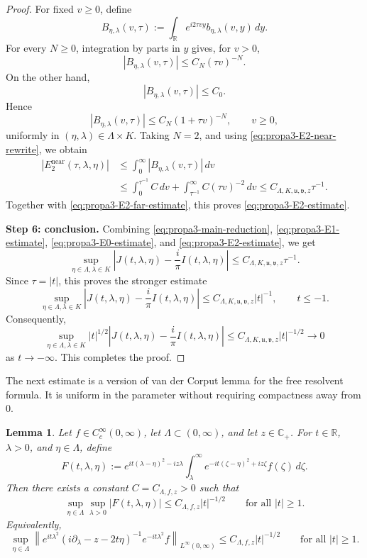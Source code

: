 \documentclass[10pt]{article}
\newtheorem{lemma}[theorem]{Lemma}
\numberwithin{equation}{section}
\numberwithin{theorem}{section}
\begin{document}
\begin{appendix}
\begin{proof}
For fixed \(v\ge0\), define
\[
B_{\eta,\lambda}(v,\tau)
:=
\int_{\mathbb R}e^{i2\tau vy}b_{\eta,\lambda}(v,y)\,dy.
\]
For every \(N\ge0\), integration by parts in \(y\) gives, for \(v>0\),
\[
|B_{\eta,\lambda}(v,\tau)|
\le
C_N(\tau v)^{-N}.
\]
On the other hand,
\[
|B_{\eta,\lambda}(v,\tau)|\le C_0.
\]
Hence
\begin{equation}
\label{eq:propa3-B-bound}
|B_{\eta,\lambda}(v,\tau)|
\le
C_N(1+\tau v)^{-N},
\qquad v\ge0,
\end{equation}
uniformly in \((\eta,\lambda)\in\Lambda\times K\). Taking \(N=2\), and using
\eqref{eq:propa3-E2-near-rewrite}, we obtain
\[
\begin{aligned}
|E_2^{\mathrm{near}}(\tau,\lambda,\eta)|
&\le
\int_0^\infty |B_{\eta,\lambda}(v,\tau)|\,dv  \\
&\le
\int_0^{\tau^{-1}} C\,dv
+
\int_{\tau^{-1}}^\infty C(\tau v)^{-2}\,dv
\le
C_{\Lambda,K,\mathfrak u,\mathfrak v,z}\tau^{-1}.
\end{aligned}
\]
Together with \eqref{eq:propa3-E2-far-estimate}, this proves
\eqref{eq:propa3-E2-estimate}.

\medskip
\noindent\textbf{Step 6: conclusion.}
Combining \eqref{eq:propa3-main-reduction}, \eqref{eq:propa3-E1-estimate},
\eqref{eq:propa3-E0-estimate}, and \eqref{eq:propa3-E2-estimate}, we get
\[
\sup_{\eta\in\Lambda,\lambda\in K}
\left|
J(t,\lambda,\eta)-\frac{i}{\pi}I(t,\lambda,\eta)
\right|
\le
C_{\Lambda,K,\mathfrak u,\mathfrak v,z}\tau^{-1}.
\]
Since \(\tau=|t|\), this proves the stronger estimate
\[
\sup_{\eta\in\Lambda,\lambda\in K}
\left|
J(t,\lambda,\eta)-\frac{i}{\pi}I(t,\lambda,\eta)
\right|
\le
C_{\Lambda,K,\mathfrak u,\mathfrak v,z}|t|^{-1},
\qquad t\le-1.
\]
Consequently,
\[
\sup_{\eta\in\Lambda,\lambda\in K}
|t|^{1/2}
\left|
J(t,\lambda,\eta)-\frac{i}{\pi}I(t,\lambda,\eta)
\right|
\le
C_{\Lambda,K,\mathfrak u,\mathfrak v,z}|t|^{-1/2}
\to0
\]
as \(t\to-\infty\). This completes the proof.
\end{proof}
The next estimate is a version of van der Corput lemma for the free resolvent formula. It is
uniform in the parameter without requiring compactness away from \(0\).
\begin{lemma}
\label{lemma a.3}
Let \(f\in C_c^\infty(0,\infty)\), let \(\Lambda\subset(0,\infty)\), and let
\(z\in\mathbb C_+\). For \(t\in\mathbb R\), \(\lambda>0\), and \(\eta\in\Lambda\), define
\[
F(t,\lambda,\eta)
:=
e^{it(\lambda-\eta)^2-iz\lambda}
\int_\lambda^\infty
e^{-it(\zeta-\eta)^2+iz\zeta}f(\zeta)\,d\zeta .
\]
Then there exists a constant \(C=C_{\Lambda,f,z}>0\) such that
\begin{equation}
\label{A.3.1}
\sup_{\eta\in\Lambda}\sup_{\lambda>0}
|F(t,\lambda,\eta)|
\le
C_{\Lambda,f,z}|t|^{-1/2}
\qquad\text{for all } |t|\ge1 .
\end{equation}
Equivalently,
\begin{equation}
\label{A.3.2}
\sup_{\eta\in\Lambda}
\left\|
e^{it\lambda^2}
(i\partial_\lambda-z-2t\eta)^{-1}
e^{-it\lambda^2}f
\right\|_{L^\infty(0,\infty)}
\le
C_{\Lambda,f,z}|t|^{-1/2}
\qquad\text{for all } |t|\ge1 .
\end{equation}
\end{lemma}


\end{appendix}
\end{document}
